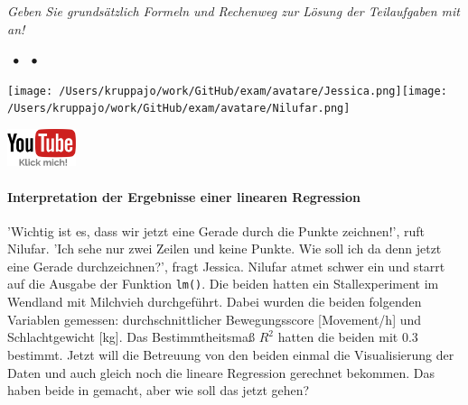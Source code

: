 \documentclass[a4paper, 9pt]{scrartcl}\usepackage[]{graphicx}\usepackage[]{xcolor}
\begin{document}
\textit{Geben Sie grundsätzlich Formeln und Rechenweg zur Lösung der Teilaufgaben mit an!} \\[1Ex]
 

 
\ifcollection
\begin{flushright}
\tiny\vspace{-3Ex}
\textbf{\examinhaltstart}
\exammodulestat $\;\bullet$
\exammodulestatbbv $\;\bullet$
\exammodulestatversuch 
\vspace{-4Ex}
\end{flushright}
\begin{minipage}[t]{0.5\textwidth}
\texttt{[image: /Users/kruppajo/work/GitHub/exam/avatare/Jessica.png]}\hspace{-4mm}\texttt{[image: /Users/kruppajo/work/GitHub/exam/avatare/Nilufar.png]}
\end{minipage}
\begin{minipage}[t]{0.5\textwidth}
\hfill
\href{https://youtu.be/5eP9VjecZmk}{\includegraphics[width = 2cm]{img/youtube}}
\end{minipage}
\fi



\ifcollection
\paragraph{Interpretation der Ergebnisse einer linearen Regression}
\fi

'Wichtig ist es, dass wir jetzt eine Gerade durch die Punkte zeichnen!', ruft Nilufar. 'Ich sehe nur zwei Zeilen und keine Punkte. Wie soll ich da denn jetzt eine Gerade durchzeichnen?', fragt Jessica. Nilufar atmet schwer ein und starrt auf die \Rlogo Ausgabe der Funktion \texttt{lm()}. Die beiden hatten ein Stallexperiment im Wendland mit Milchvieh durchgeführt. Dabei wurden die beiden folgenden Variablen gemessen: durchschnittlicher Bewegungsscore [Movement/h] und Schlachtgewicht [kg]. Das Bestimmtheitsmaß $R^2$ hatten die beiden mit 0.3 bestimmt.  Jetzt will die Betreuung von den beiden einmal die Visualisierung der Daten und auch gleich noch die lineare Regression gerechnet bekommen. Das haben beide in \Rlogo gemacht, aber wie soll das jetzt gehen?
\end{document}
